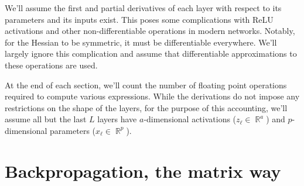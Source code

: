 \documentclass{article}
\newcommand{\R}{\mathop{\mathbb{R}}}
\begin{document}
We'll assume the first and partial derivatives of each layer with respect to its
parameters and its inputs exist. This poses some complications with ReLU
activations and other non-differentiable operations in modern networks. Notably,
for the Hessian to be symmetric, it must be differentiable everywhere.  We'll
largely ignore this complication and assume that differentiable approximations to these
operations are used.

At the end of each section, we'll count the number of floating point operations required to compute various
expressions. While the derivations do not impose any restrictions on the shape of the layers, for the purpose of this
accounting, we'll assume all but the last $L$ layers have $a$-dimensional activations ($z_\ell \in \R^a$) and
$p$-dimensional parameters ($x_\ell \in \R^p$).

\section{Backpropagation, the matrix way}
\end{document}
